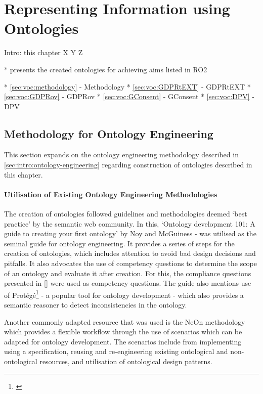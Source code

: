 \chapter{Representing Information using Ontologies}
\label{chapter:vocabularies}

Intro: this chapter X Y Z

* presents the created ontologies for achieving aims listed in RO2

* \autoref{sec:voc:methodology} - Methodology
* \autoref{sec:voc:GDPRtEXT} - GDPRtEXT
* \autoref{sec:voc:GDPRov} - GDPRov
* \autoref{sec:voc:GConsent} - GConsent
* \autoref{sec:voc:DPV} - DPV

\section{Methodology for Ontology Engineering}\label{sec:voc:methodology}
This section expands on the ontology engineering methodology described in \autoref{sec:intro:ontology-engineering} regarding construction of ontologies described in this chapter.

\subsubsection*{Utilisation of Existing Ontology Engineering Methodologies}
The creation of ontologies followed guidelines and methodologies deemed `best practice' by the semantic web community. In this, `Ontology development 101: A guide to creating your first ontology' by Noy and McGuiness \cite{} - was utilised as the seminal guide for ontology engineering. It provides a series of steps for the creation of ontologies, which includes attention to avoid bad design decisions and pitfalls. It also advocates the use of competency questions to determine the scope of an ontology and evaluate it after creation. For this, the compliance questions presented in \autoref{} were used as competency questions. The guide also mentions use of Protégé\footnote{\url{}} \cite{} - a popular tool for ontology development - which also provides a semantic reasoner to detect inconsistencies in the ontology.

Another commonly adapted resource that was used is the NeOn methodology \cite{} which provides a flexible workflow through the use of scenarios which can be adapted for ontology development. The scenarios include from implementing using a specification, reusing and re-engineering existing ontological and non-ontological resources, and utilisation of ontological design patterns.

